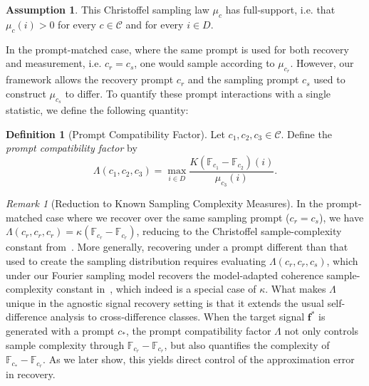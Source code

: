 \documentclass{article}
\theoremstyle{plain}
\theoremstyle{definition}
\newtheorem{definition}[theorem]{Definition}
\newtheorem{assumption}[theorem]{Assumption}
\theoremstyle{remark}
\newtheorem{remark}[theorem]{Remark}
\begin{document}
\begin{assumption}\label{assump: full support}
    This Christoffel sampling law $\mu_c$ has full-support, i.e. that $\mu_c(i) > 0$ for every $c \in \mathcal C$ and for every $i \in D$.
\end{assumption}


In the prompt-matched case, where the same prompt is used for both recovery and measurement, i.e. $c_r = c_s$, one would sample according to $\mu_{c_r}$. However, our framework allows the recovery prompt $c_r$ and the sampling prompt $c_s$ used to construct $\mu_{c_s}$ to differ. To quantify these prompt interactions with a single statistic, we define the following quantity:

\begin{definition}[Prompt Compatibility Factor]
  Let $c_1,c_2,c_3 \in \mathcal{C}$. Define the \emph{prompt compatibility factor} by
  \[
    \Lambda(c_1,c_2,c_3)
    =
    \max_{i \in D}
    \frac{K(\mathbb{F}_{c_1}-\mathbb{F}_{c_2})(i)}{\mu_{c_3}(i)}.
  \]
  \label{def: prompt compatibility factor}
\end{definition}

\begin{remark}[Reduction to Known Sampling Complexity Measures]
In the prompt-matched case where we recover over the same sampling prompt ($c_r = c_s$), we have $\Lambda(c_r,c_r,c_r)=\kappa(\mathbb F_{c_r}-\mathbb F_{c_r})$, reducing to the Christoffel sample-complexity constant from~\cite{adcock2023cs4ml}. More generally, recovering under a prompt different than that used to create the sampling distribution requires evaluating $\Lambda(c_r,c_r,c_s)$, which under our Fourier sampling model recovers the model-adapted coherence sample-complexity constant in~\cite{berk2023modeladapted, plan2025denoising}, which indeed is a special case of $\kappa$. What makes $\Lambda$ unique in the agnostic signal recovery setting is that it extends the usual self-difference analysis to cross-difference classes. When the target signal $\mathbf f^*$ is generated with a prompt $c_*$, the prompt compatibility factor $\Lambda$ not only controls sample complexity through $\mathbb F_{c_r}-\mathbb F_{c_r}$, but also quantifies the complexity of $\mathbb F_{c_*}-\mathbb F_{c_r}$. As we later show, this yields direct control of the approximation error in recovery.
\end{remark}
\end{document}

